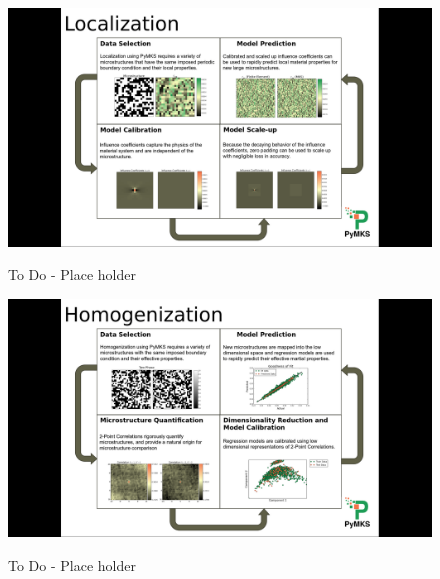 \documentclass{bmcart}
\begin{document}
\begin{figure}[h!]
  \caption{
     To Do - Place holder}
    \includegraphics[scale=.18]{fig/localization.png}
  \label{fig:loc}
\end{figure}


\begin{figure}[h!]
  \caption{
     To Do - Place holder}
    \includegraphics[scale=.18]{fig/homogenization.png}
  \label{fig:hom}
\end{figure}

\end{document}
